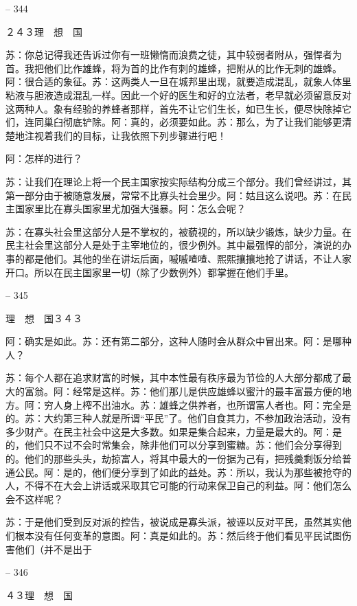 \documentclass[11pt,oneside]{book}
\begin{document}
\begin{common-format}
    

-- 344

    ２４３理　想　国

    苏：你总记得我还告诉过你有一班懒惰而浪费之徒，其中较弱者附从，强悍者为首。我把他们比作雄蜂，将为首的比作有刺的雄蜂，把附从的比作无刺的雄蜂。阿：很合适的象征。苏：这两类人一旦在城邦里出现，就要造成混乱，就象人体里粘液与胆液造成混乱一样。因此一个好的医生和好的立法者，老早就必须留意反对这两种人。象有经验的养蜂者那样，首先不让它们生长，如已生长，便尽快除掉它们，连同巢臼彻底铲除。阿：真的，必须要如此。苏：那么，为了让我们能够更清楚地注视着我们的目标，让我依照下列步骤进行吧！

    阿：怎样的进行？

    苏：让我们在理论上将一个民主国家按实际结构分成三个部分。我们曾经讲过，其第一部分由于被随意发展，常常不比寡头社会里少。阿：姑且这么说吧。苏：在民主国家里比在寡头国家里尤加强大强暴。阿：怎么会呢？

    苏：在寡头社会里这部分人是不掌权的，被藐视的，所以缺少锻炼，缺少力量。在民主社会里这部分人是处于主宰地位的，很少例外。其中最强悍的部分，演说的办事的都是他们。其他的坐在讲坛后面，嘁嘁喳喳、熙熙攘攘地抢了讲话，不让人家开口。所以在民主国家里一切（除了少数例外）都掌握在他们手里。

    

-- 345

    理　想　国３４３

    阿：确实是如此。苏：还有第二部分，这种人随时会从群众中冒出来。阿：是哪种人？

    苏：每个人都在追求财富的时候，其中本性最有秩序最为节俭的人大部分都成了最大的富翁。阿：经常是这样。苏：他们那儿是供应雄蜂以蜜汁的最丰富最方便的地方。阿：穷人身上榨不出油水。苏：雄蜂之供养者，也所谓富人者也。阿：完全是的。苏：大约第三种人就是所谓“平民”了。他们自食其力，不参加政治活动，没有多少财产。在民主社会中这是大多数。如果是集合起来，力量是最大的。阿：是的，他们只不过不会时常集会，除非他们可以分享到蜜糖。苏：他们会分享得到的。他们的那些头头，劫掠富人，将其中最大的一份据为己有，把残羹剩饭分给普通公民。阿：是的，他们便分享到了如此的益处。苏：所以，我认为那些被抢夺的人，不得不在大会上讲话或采取其它可能的行动来保卫自己的利益。阿：他们怎么会不这样呢？

    苏：于是他们受到反对派的控告，被说成是寡头派，被诬以反对平民，虽然其实他们根本没有任何变革的意图。阿：真是如此的。苏：然后终于他们看见平民试图伤害他们（并不是出于

    

-- 346

    ４３理　想　国


\end{common-format}
\end{document}
